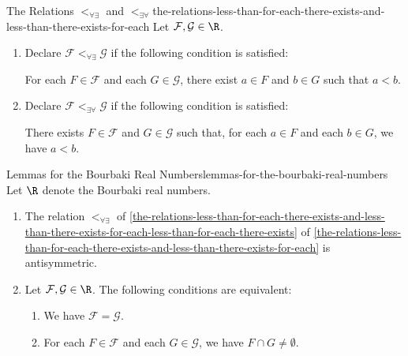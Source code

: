 \begin{definition}{The Relations $\less_{\forall\exists}$ and $\less_{\exists\forall}$}{the-relations-less-than-for-each-there-exists-and-less-than-there-exists-for-each}%
    Let $\mathcal{F},\mathcal{G}\in\R$.
    \begin{enumerate}
        \item\label{the-relations-less-than-for-each-there-exists-and-less-than-there-exists-for-each-less-than-for-each-there-exists}Declare $\mathcal{F}\less_{\forall\exists}\mathcal{G}$ if the following condition is satisfied:
            \begin{itemize}
                \itemstar For each $F\in\mathcal{F}$ and each $G\in\mathcal{G}$, there exist $a\in F$ and $b\in G$ such that $a\less b$.
            \end{itemize}
        \item\label{the-relations-less-than-for-each-there-exists-and-less-than-there-exists-for-each-less-than-there-exists-for-each}Declare $\mathcal{F}\less_{\exists\forall}\mathcal{G}$ if the following condition is satisfied:
            \begin{itemize}
                \itemstar There exists $F\in\mathcal{F}$ and $G\in\mathcal{G}$ such that, for each $a\in F$ and each $b\in G$, we have $a\less b$.
            \end{itemize}
    \end{enumerate}
\end{definition}
\begin{lemma}{Lemmas for the Bourbaki Real Numbers}{lemmas-for-the-bourbaki-real-numbers}%
    Let $\R$ denote the Bourbaki real numbers.
    \begin{enumerate}
        \item\label{lemmas-for-the-bourbaki-real-numbers-antisymmetry-of-less-than-for-each-there-exists}The relation $\less_{\forall\exists}$ of \cref{the-relations-less-than-for-each-there-exists-and-less-than-there-exists-for-each-less-than-for-each-there-exists} of \cref{the-relations-less-than-for-each-there-exists-and-less-than-there-exists-for-each} is antisymmetric.
        \item\label{lemmas-for-the-bourbaki-real-numbers-an-equality-criterion-for-bourbaki-real-numbers}Let $\mathcal{F},\mathcal{G}\in\R$. The following conditions are equivalent:
            \begin{enumerate}
                \item\label{lemmas-for-the-bourbaki-real-numbers-an-equality-criterion-for-bourbaki-real-numbers-1}We have $\mathcal{F}=\mathcal{G}$.
                \item\label{lemmas-for-the-bourbaki-real-numbers-an-equality-criterion-for-bourbaki-real-numbers-2}For each $F\in\mathcal{F}$ and each $G\in\mathcal{G}$, we have $F\cap G\neq\emptyset$.
            \end{enumerate}
    \end{enumerate}
\end{lemma}

